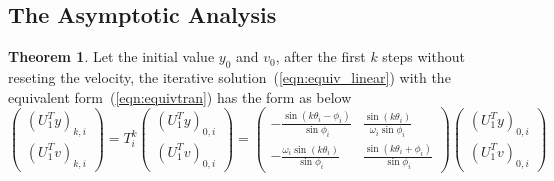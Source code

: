\documentclass[11pt,fceqn]{article}
\numberwithin{equation}{section}
\theoremstyle{definition}
\newtheorem{thm}{Theorem}[section]
\begin{document}
\subsection{The Asymptotic Analysis}
\begin{thm}
\label{thm:recur}
Let the initial value $y_{0}$ and $v_{0}$, after the first $k$ steps without reseting the velocity, the iterative solution~(\ref{eqn:equiv_linear}) with the equivalent form~(\ref{eqn:equivtran}) has the form as below
\begin{equation}
\label{eqn:sol}
 \begin{pmatrix} (U_{1}^{T}y)_{k,i} \\ (U_{1}^{T}v)_{k,i} \end{pmatrix} =T_{i}^{k}  \begin{pmatrix} (U_{1}^{T}y)_{0,i} \\ (U_{1}^{T}v)_{0,i} \end{pmatrix} = \begin{pmatrix}
                    -\frac{\sin(k\theta_{i} - \phi_{i})}{\sin\phi_{i}} & \frac{\sin (k\theta_{i})}{\omega_{i}\sin\phi_{i}} \\
                    -\frac{\omega_{i} \sin (k\theta_{i})}{\sin\phi_{i}} & \frac{\sin(k\theta_{i} + \phi_{i})}{\sin\phi_{i}}
                    \end{pmatrix} \begin{pmatrix} (U_{1}^{T}y)_{0,i} \\ (U_{1}^{T}v)_{0,i} \end{pmatrix}
\end{equation}
\end{thm}
\end{document}
